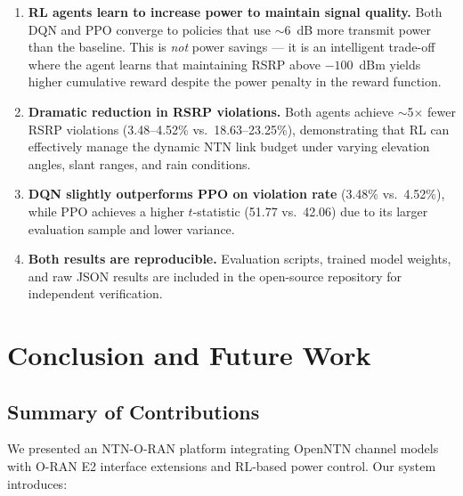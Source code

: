 \documentclass[conference]{IEEEtran}
\begin{document}
\begin{enumerate}
    \item \textbf{RL agents learn to increase power to maintain signal quality.} Both DQN and PPO converge to policies that use $\sim$6~dB more transmit power than the baseline. This is \emph{not} power savings --- it is an intelligent trade-off where the agent learns that maintaining RSRP above $-100$~dBm yields higher cumulative reward despite the power penalty in the reward function.

    \item \textbf{Dramatic reduction in RSRP violations.} Both agents achieve $\sim$5$\times$ fewer RSRP violations (3.48--4.52\% vs.\ 18.63--23.25\%), demonstrating that RL can effectively manage the dynamic NTN link budget under varying elevation angles, slant ranges, and rain conditions.

    \item \textbf{DQN slightly outperforms PPO on violation rate} (3.48\% vs.\ 4.52\%), while PPO achieves a higher $t$-statistic (51.77 vs.\ 42.06) due to its larger evaluation sample and lower variance.

    \item \textbf{Both results are reproducible.} Evaluation scripts, trained model weights, and raw JSON results are included in the open-source repository for independent verification.
\end{enumerate}

\section{Conclusion and Future Work}

\subsection{Summary of Contributions}

We presented an NTN-O-RAN platform integrating OpenNTN channel models with O-RAN E2 interface extensions and RL-based power control. Our system introduces:
\end{document}

